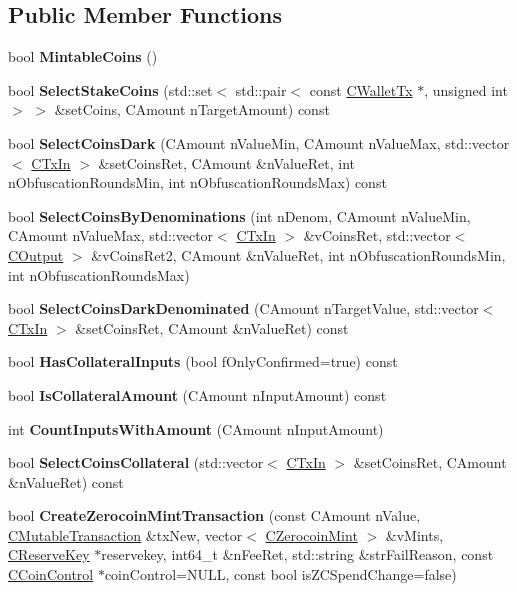 \subsection*{Public Member Functions}
\begin{DoxyCompactItemize}
\item 
bool {\bfseries Mintable\+Coins} ()
\item 
bool {\bfseries Select\+Stake\+Coins} (std\+::set$<$ std\+::pair$<$ const \mbox{\hyperlink{class_c_wallet_tx}{C\+Wallet\+Tx}} $\ast$, unsigned int $>$ $>$ \&set\+Coins, C\+Amount n\+Target\+Amount) const
\item 
bool {\bfseries Select\+Coins\+Dark} (C\+Amount n\+Value\+Min, C\+Amount n\+Value\+Max, std\+::vector$<$ \mbox{\hyperlink{class_c_tx_in}{C\+Tx\+In}} $>$ \&set\+Coins\+Ret, C\+Amount \&n\+Value\+Ret, int n\+Obfuscation\+Rounds\+Min, int n\+Obfuscation\+Rounds\+Max) const
\item 
bool {\bfseries Select\+Coins\+By\+Denominations} (int n\+Denom, C\+Amount n\+Value\+Min, C\+Amount n\+Value\+Max, std\+::vector$<$ \mbox{\hyperlink{class_c_tx_in}{C\+Tx\+In}} $>$ \&v\+Coins\+Ret, std\+::vector$<$ \mbox{\hyperlink{class_c_output}{C\+Output}} $>$ \&v\+Coins\+Ret2, C\+Amount \&n\+Value\+Ret, int n\+Obfuscation\+Rounds\+Min, int n\+Obfuscation\+Rounds\+Max)
\item 
\mbox{\label{class_c_wallet_ad455f90e04a396e7dc000d3c36f4e4e8}} 
bool {\bfseries Select\+Coins\+Dark\+Denominated} (C\+Amount n\+Target\+Value, std\+::vector$<$ \mbox{\hyperlink{class_c_tx_in}{C\+Tx\+In}} $>$ \&set\+Coins\+Ret, C\+Amount \&n\+Value\+Ret) const
\item 
bool {\bfseries Has\+Collateral\+Inputs} (bool f\+Only\+Confirmed=true) const
\item 
bool {\bfseries Is\+Collateral\+Amount} (C\+Amount n\+Input\+Amount) const
\item 
int {\bfseries Count\+Inputs\+With\+Amount} (C\+Amount n\+Input\+Amount)
\item 
bool {\bfseries Select\+Coins\+Collateral} (std\+::vector$<$ \mbox{\hyperlink{class_c_tx_in}{C\+Tx\+In}} $>$ \&set\+Coins\+Ret, C\+Amount \&n\+Value\+Ret) const
\item 
\mbox{\label{class_c_wallet_a5abe241d23c504e1c80ee3a590cb2dc7}} 
bool {\bfseries Create\+Zerocoin\+Mint\+Transaction} (const C\+Amount n\+Value, \mbox{\hyperlink{struct_c_mutable_transaction}{C\+Mutable\+Transaction}} \&tx\+New, vector$<$ \mbox{\hyperlink{class_c_zerocoin_mint}{C\+Zerocoin\+Mint}} $>$ \&v\+Mints, \mbox{\hyperlink{class_c_reserve_key}{C\+Reserve\+Key}} $\ast$reservekey, int64\+\_\+t \&n\+Fee\+Ret, std\+::string \&str\+Fail\+Reason, const \mbox{\hyperlink{class_c_coin_control}{C\+Coin\+Control}} $\ast$coin\+Control=N\+U\+LL, const bool is\+Z\+C\+Spend\+Change=false)

\end{DoxyCompactItemize}
